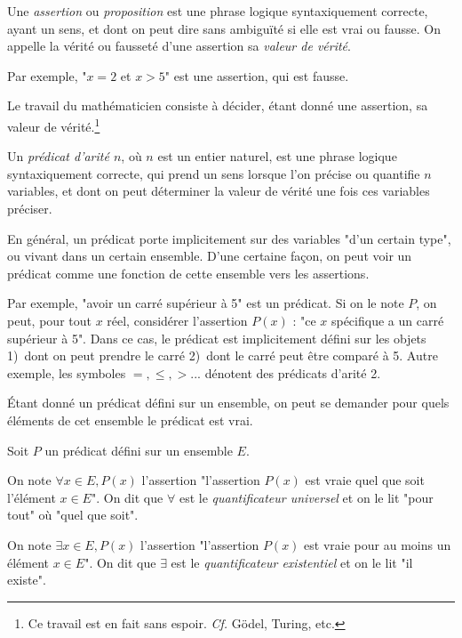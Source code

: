 \begin{dftn}
    Une \emph{assertion} ou \emph{proposition} est une phrase logique syntaxiquement correcte, ayant un sens, et dont on peut dire sans ambiguïté si elle est vrai ou fausse. On appelle la vérité ou fausseté d'une assertion sa \emph{valeur de vérité}. 
\end{dftn}

\begin{lined}
    Par exemple, "$x = 2$ et $x > 5$" est une assertion, qui est fausse.
\end{lined}

Le travail du mathématicien consiste à décider, étant donné une assertion, sa valeur de vérité.\footnote{Ce travail est en fait sans espoir. \textit{Cf.} Gödel, Turing, etc.}

\begin{dftn}
    Un \emph{prédicat d'arité $n$}, où $n$ est un entier naturel, est une phrase logique syntaxiquement correcte, qui prend un sens lorsque l'on précise ou quantifie $n$ variables, et dont on peut déterminer la valeur de vérité une fois ces variables préciser.
\end{dftn}

En général, un prédicat porte implicitement sur des variables "d'un certain type", ou vivant dans un certain ensemble. D'une certaine façon, on peut voir un prédicat comme une fonction de cette ensemble vers les assertions.

\begin{lined}
    Par exemple, "avoir un carré supérieur à 5" est un prédicat. Si on le note $P$, on peut, pour tout $x$ réel, considérer l'assertion $P(x)$ : "ce $x$ spécifique a un carré supérieur à 5". Dans ce cas, le prédicat est implicitement défini sur les objets 1)~dont on peut prendre le carré 2)~dont le carré peut être comparé à 5. Autre exemple, les symboles $=, \leq, >$... dénotent des prédicats d'arité 2.
\end{lined}

Étant donné un prédicat défini sur un ensemble, on peut se demander pour quels éléments de cet ensemble le prédicat est vrai.

\begin{dftn}
    Soit $P$ un prédicat défini sur un ensemble $E$. 
    
    On note $\forall x \in E, P(x)$ l'assertion "l'assertion $P(x)$ est vraie quel que soit l'élément $x \in E$". On dit que $\forall$ est le \emph{quantificateur universel} et on le lit "pour tout" où "quel que soit".

    On note $\exists x \in E, P(x)$ l'assertion "l'assertion $P(x)$ est vraie pour au moins un élément $x \in E$". On dit que $\exists$ est le \emph{quantificateur existentiel} et on le lit "il existe".
\end{dftn}

